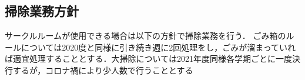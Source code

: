 \subsection*{掃除業務方針}


サークルルームが使用できる場合は以下の方針で掃除業務を行う．
ごみ箱のルールについては2020度と同様に引き続き週に2回処理をし，ごみが溜まっていれば適宜処理することとする．大掃除については2021年度同様各学期ごとに一度決行するが，コロナ禍により少人数で行うこととする
